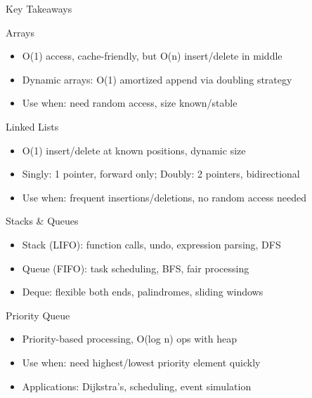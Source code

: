\documentclass[aspectratio=169,xcolor=dvipsnames]{beamer}
\begin{document}
\begin{frame}{Key Takeaways}
  \begin{block}{Arrays}
    \begin{itemize}
      \item O(1) access, cache-friendly, but O(n) insert/delete in middle
      \item Dynamic arrays: O(1) amortized append via doubling strategy
      \item Use when: need random access, size known/stable
    \end{itemize}
  \end{block}

  \begin{block}{Linked Lists}
    \begin{itemize}
      \item O(1) insert/delete at known positions, dynamic size
      \item Singly: 1 pointer, forward only; Doubly: 2 pointers, bidirectional
      \item Use when: frequent insertions/deletions, no random access needed
    \end{itemize}
  \end{block}

  \begin{block}{Stacks \& Queues}
    \begin{itemize}
      \item Stack (LIFO): function calls, undo, expression parsing, DFS
      \item Queue (FIFO): task scheduling, BFS, fair processing
      \item Deque: flexible both ends, palindromes, sliding windows
    \end{itemize}
  \end{block}

  \begin{block}{Priority Queue}
    \begin{itemize}
      \item Priority-based processing, O(log n) ops with heap
      \item Use when: need highest/lowest priority element quickly
      \item Applications: Dijkstra's, scheduling, event simulation
    \end{itemize}
  \end{block}
\end{frame}
\end{document}
